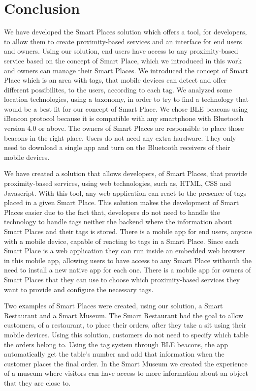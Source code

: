 
\section{Conclusion}
\label{sec:conclusion}
We have developed the Smart Places solution which offers a tool, for developers, to allow them to create proximity-based services and an interface for end users and owners.
Using our solution, end users have access to any proximity-based service based on the concept of Smart Place, which we introduced in this work and owners can manage their Smart Places.
We introduced the concept of Smart Place which is an area with tags, that mobile devices can detect and offer different possibilites, to the users, according to each tag.
We analyzed some location technologies, using a taxonomy\cite{location}, in order to try to find a technology that would be a best fit for our concept of Smart Place.
We chose \gls{BLE} beacons using iBeacon protocol because it is compatible with any smartphone with Bluetooth version 4.0 or above.
The owners of Smart Places are responsible to place those beacons in the right place.
Users do not need any extra hardware.
They only need to download a single app and turn on the Bluetooth receivers of their mobile devices.

We have created a solution that allows developers, of Smart Places, that provide proximity-based services, using web technologies, such as, \gls{HTML}, \gls{CSS} and Javascript.
With this tool, any web application can react to the presence of tags placed in a given Smart Place.
This solution makes the development of Smart Places easier due to the fact that, developers do not need to handle the technology to handle tags neither the backend where the information about Smart Places and their tags is stored.
There is a mobile app for end users, anyone with a mobile device, capable of reacting to tags in a Smart Place.
Since each Smart Place is a web application they can run inside an embedded web browser in this mobile app, allowing users to have access to any Smart Place withouth the need to install a new native app for each one.
There is a mobile app for owners of Smart Places that they can use to choose which proximity-based services they want to provide and configure the necessary tags.

Two examples of Smart Places were created, using our solution, a Smart Restaurant and a Smart Museum.
The Smart Restaurant had the goal to allow customers, of a restaurant, to place their orders, after they take a sit using their mobile devices.
Using this solution, customers do not need to specify which table the orders belong to. Using the tag system through \gls{BLE} beacons, the app automatically get the table's number and add that information when the customer places the final order.
In the Smart Museum we created the experience of a museum where visitors can have access to more information about an object that they are close to.

